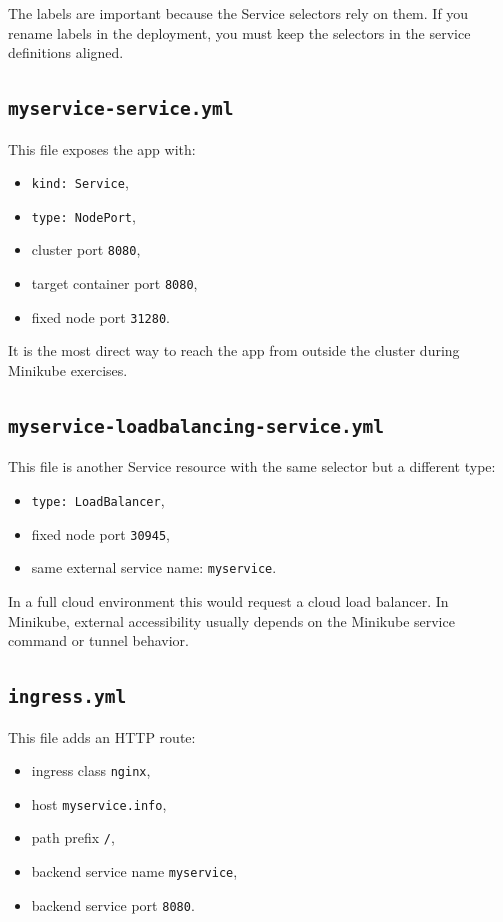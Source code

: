 \documentclass[11pt,a4paper]{article}
\newcommand{\pathitem}[1]{\texorpdfstring{\nolinkurl{#1}}{#1}}
\newcommand{\cmd}[1]{\texttt{#1}}
\begin{document}
The labels are important because the Service selectors rely on them. If you rename labels in the deployment, you must keep the selectors in the service definitions aligned.

\subsection{\pathitem{myservice-service.yml}}

This file exposes the app with:

\begin{itemize}
\item \cmd{kind: Service},
\item \cmd{type: NodePort},
\item cluster port \cmd{8080},
\item target container port \cmd{8080},
\item fixed node port \cmd{31280}.
\end{itemize}

It is the most direct way to reach the app from outside the cluster during Minikube exercises.

\subsection{\pathitem{myservice-loadbalancing-service.yml}}

This file is another Service resource with the same selector but a different type:

\begin{itemize}
\item \cmd{type: LoadBalancer},
\item fixed node port \cmd{30945},
\item same external service name: \cmd{myservice}.
\end{itemize}

In a full cloud environment this would request a cloud load balancer. In Minikube, external accessibility usually depends on the Minikube service command or tunnel behavior.

\subsection{\pathitem{ingress.yml}}

This file adds an HTTP route:

\begin{itemize}
\item ingress class \cmd{nginx},
\item host \cmd{myservice.info},
\item path prefix \cmd{/},
\item backend service name \cmd{myservice},
\item backend service port \cmd{8080}.
\end{itemize}
\end{document}
